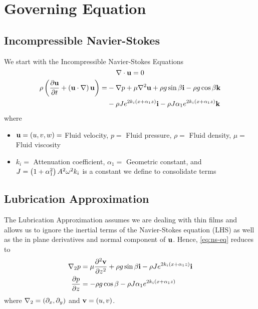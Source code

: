 \section{Governing Equation}
\subsection{Incompressible Navier-Stokes}
\begin{frame}
    We start with the Incompressible Navier-Stokes Equations
    \begin{equation}
        \nabla \cdot \textbf{u} = 0
        \label{eq:incompress}
    \end{equation}
    \begin{equation}
        \begin{aligned}
            \rho \left( \frac{\partial \textbf{u}}{\partial t} + \left( \textbf{u} \cdot \nabla \right)\textbf{u} \right) = &-\nabla p
            + \mu \nabla^2 \textbf{u} + \rho g \sin \beta \textbf{i} - \rho g \cos \beta \textbf{k} \\
            &- \rho J e^{2k_i \left( x + \alpha_1 z \right)} \textbf{i} - \rho J \alpha_1 e^{2k_i \left( x + \alpha_1 z \right)} \textbf{k}
        \end{aligned}
        \label{eq:ns-eq}
    \end{equation}
    where 
    \begin{itemize} 
        \item $\textbf{u} = \left( u,v,w \right) =$ Fluid velocity, $p =$ Fluid pressure, $\rho =$ Fluid density, $\mu =$ Fluid viscosity
        \item $k_i =$  Attenuation coefficient, $\alpha_1 =$ Geometric constant, and $J = \left( 1 + \alpha_1^2 \right)A^2\omega^2 k_i$
        is a constant we define to consolidate terms
    \end{itemize}

\end{frame}
\subsection{Lubrication Approximation}
\begin{frame}
    The Lubrication Approximation assumes we are dealing with thin films
    and allows us to ignore the inertial terms of the Navier-Stokes equation (LHS) as well as the in plane
    derivatives and normal component of $\textbf{u}$. Hence, \cref{eq:ns-eq} reduces to 
    \begin{equation}
        \begin{aligned}
            \nabla_2 p &= \mu \frac{\partial^2 \textbf{v}}{\partial z^2} + \rho g \sin\beta \textbf{i} - \rho Je^{2k_i \left( x + \alpha_1 z \right)}\textbf{i}\\
            \frac{\partial p}{\partial z} &= -\rho g \cos\beta - \rho J\alpha_1 e^{2k_i \left( x + \alpha_1 z \right)}
        \end{aligned}
        \label{eq:lub_approx}
    \end{equation}
    where $\nabla_2 = \left( \partial_x, \partial_y \right)$ and $\textbf{v} = \left( u, v \right)$. 
\end{frame}

